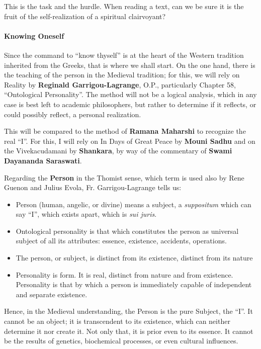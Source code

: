 This is the task and the hurdle. When reading a text, can we be sure it is the fruit of the self-realization of a spiritual clairvoyant?

\paragraph{Knowing Oneself}


Since the command to ``know thyself'' is at the heart of the Western tradition inherited from the Greeks, that is where we shall start. On the one hand, there is the teaching of the person in the Medieval tradition; for this, we will rely on Reality by \textbf{Reginald Garrigou-Lagrange}, O.P., particularly Chapter 58, ``Ontological Personality''. The method will not be a logical analysis, which in any case is best left to academic philosophers, but rather to determine if it reflects, or could possibly reflect, a personal realization.

This will be compared to the method of \textbf{Ramana Maharshi} to recognize the real ``I''. For this, I will rely on In Days of Great Peace by \textbf{Mouni Sadhu} and on the Vivekacudamani by
\textbf{Shankara}, by way of the commentary of \textbf{Swami Dayananda Saraswati}.

Regarding the \textbf{Person} in the Thomist sense, which term is used also by Rene Guenon and Julius Evola, Fr. Garrigou-Lagrange tells us:

\begin{itemize}


\item Person (human, angelic, or divine) means a subject, a \emph{suppositum} which can say ``I'', which exists apart, which is \emph{sui juris}.

\item Ontological personality is that which constitutes the person as universal subject of all its attributes: essence, existence, accidents, operations.

\item The person, or subject, is distinct from its existence, distinct from its nature

\item Personality is form. It is real, distinct from nature and from existence. Personality is that by which a person is immediately capable of independent and separate existence.
\end{itemize}


Hence, in the Medieval understanding, the Person is the pure Subject, the ``I''. It cannot be an object; it is transcendent to its existence, which can neither determine it nor create it. Not only that, it is prior even to its essence. It cannot be the results of genetics, biochemical processes, or even cultural influences.

